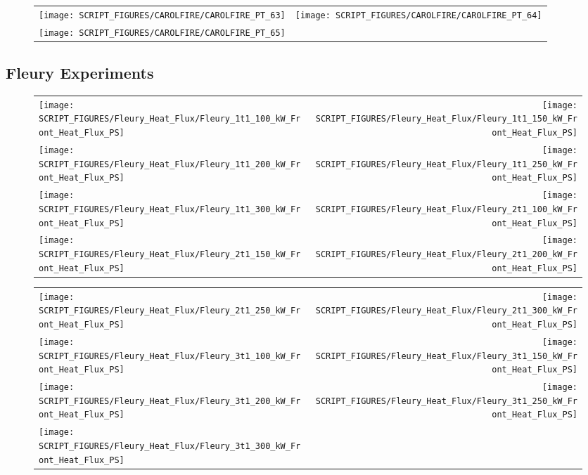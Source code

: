 \begin{figure}[!ht]
\begin{tabular*}{\textwidth}{l@{\extracolsep{\fill}}r}
\texttt{[image: SCRIPT\_FIGURES/CAROLFIRE/CAROLFIRE\_PT\_63]} &
\texttt{[image: SCRIPT\_FIGURES/CAROLFIRE/CAROLFIRE\_PT\_64]} \\
\texttt{[image: SCRIPT\_FIGURES/CAROLFIRE/CAROLFIRE\_PT\_65]}
\end{tabular*}
\end{figure}

\clearpage

\subsection{Fleury Experiments}

\begin{figure}[!ht]
\begin{tabular*}{\textwidth}{l@{\extracolsep{\fill}}r}
\texttt{[image: SCRIPT\_FIGURES/Fleury\_Heat\_Flux/Fleury\_1t1\_100\_kW\_Front\_Heat\_Flux\_PS]} &
\texttt{[image: SCRIPT\_FIGURES/Fleury\_Heat\_Flux/Fleury\_1t1\_150\_kW\_Front\_Heat\_Flux\_PS]} \\
\texttt{[image: SCRIPT\_FIGURES/Fleury\_Heat\_Flux/Fleury\_1t1\_200\_kW\_Front\_Heat\_Flux\_PS]} &
\texttt{[image: SCRIPT\_FIGURES/Fleury\_Heat\_Flux/Fleury\_1t1\_250\_kW\_Front\_Heat\_Flux\_PS]} \\
\texttt{[image: SCRIPT\_FIGURES/Fleury\_Heat\_Flux/Fleury\_1t1\_300\_kW\_Front\_Heat\_Flux\_PS]} &
\texttt{[image: SCRIPT\_FIGURES/Fleury\_Heat\_Flux/Fleury\_2t1\_100\_kW\_Front\_Heat\_Flux\_PS]} \\
\texttt{[image: SCRIPT\_FIGURES/Fleury\_Heat\_Flux/Fleury\_2t1\_150\_kW\_Front\_Heat\_Flux\_PS]} &
\texttt{[image: SCRIPT\_FIGURES/Fleury\_Heat\_Flux/Fleury\_2t1\_200\_kW\_Front\_Heat\_Flux\_PS]}
\end{tabular*}
\end{figure}

\begin{figure}[!ht]
\begin{tabular*}{\textwidth}{l@{\extracolsep{\fill}}r}
\texttt{[image: SCRIPT\_FIGURES/Fleury\_Heat\_Flux/Fleury\_2t1\_250\_kW\_Front\_Heat\_Flux\_PS]} &
\texttt{[image: SCRIPT\_FIGURES/Fleury\_Heat\_Flux/Fleury\_2t1\_300\_kW\_Front\_Heat\_Flux\_PS]} \\
\texttt{[image: SCRIPT\_FIGURES/Fleury\_Heat\_Flux/Fleury\_3t1\_100\_kW\_Front\_Heat\_Flux\_PS]} &
\texttt{[image: SCRIPT\_FIGURES/Fleury\_Heat\_Flux/Fleury\_3t1\_150\_kW\_Front\_Heat\_Flux\_PS]} \\
\texttt{[image: SCRIPT\_FIGURES/Fleury\_Heat\_Flux/Fleury\_3t1\_200\_kW\_Front\_Heat\_Flux\_PS]} &
\texttt{[image: SCRIPT\_FIGURES/Fleury\_Heat\_Flux/Fleury\_3t1\_250\_kW\_Front\_Heat\_Flux\_PS]} \\
\texttt{[image: SCRIPT\_FIGURES/Fleury\_Heat\_Flux/Fleury\_3t1\_300\_kW\_Front\_Heat\_Flux\_PS]}
\end{tabular*}
\end{figure}

